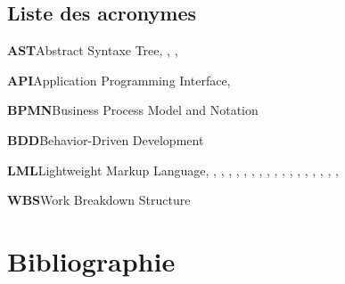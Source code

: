 \documentclass[a4paper,12pt]{article}
\begin{document}
\subsection{Liste des acronymes}
\label{sec:org10eb4af}
\begin{multicols}{2}\small{
\textbf{\hypertarget{gls-62}{AST}}\hspace*{1em}Abstract Syntaxe Tree\hspace*{.5em}\pageref{gls-3-use-1}, \pageref{gls-3-use-2}, \pageref{gls-3-use-3}, \pageref{gls-3-use-4}

\textbf{\hypertarget{gls-54}{API}}\hspace*{1em}Application Programming Interface\hspace*{.5em}\pageref{gls-5-use-1}, \pageref{gls-5-use-2}

\textbf{\hypertarget{gls-79}{BPMN}}\hspace*{1em}Business Process Model and Notation\hspace*{.5em}\pageref{gls-8-use-1}

\textbf{\hypertarget{gls-68}{BDD}}\hspace*{1em}Behavior-Driven Development\hspace*{.5em}\pageref{gls-6-use-1}

\textbf{\hypertarget{gls-208}{LML}}\hspace*{1em}Lightweight Markup Language\hspace*{.5em}\pageref{gls-2-use-1}, \pageref{gls-2-use-2}, \pageref{gls-2-use-3}, \pageref{gls-2-use-4}, \pageref{gls-2-use-5}, \pageref{gls-2-use-6}, \pageref{gls-2-use-7}, \pageref{gls-2-use-8}, \pageref{gls-2-use-9}, \pageref{gls-2-use-10}, \pageref{gls-2-use-11}, \pageref{gls-2-use-12}, \pageref{gls-2-use-13}, \pageref{gls-2-use-14}, \pageref{gls-2-use-15}, \pageref{gls-2-use-16}, \pageref{gls-2-use-17}, \pageref{gls-2-use-18}, \pageref{gls-2-use-19}

\textbf{\hypertarget{gls-348}{WBS}}\hspace*{1em}Work Breakdown Structure\hspace*{.5em}\pageref{gls-7-use-1}

}\clearpage\end{multicols}
\section{Bibliographie}
\label{sec:org9377407}
\begin{multicols}{2}\small{
\printbibliography[heading=none]
}\clearpage\end{multicols}
\end{document}
